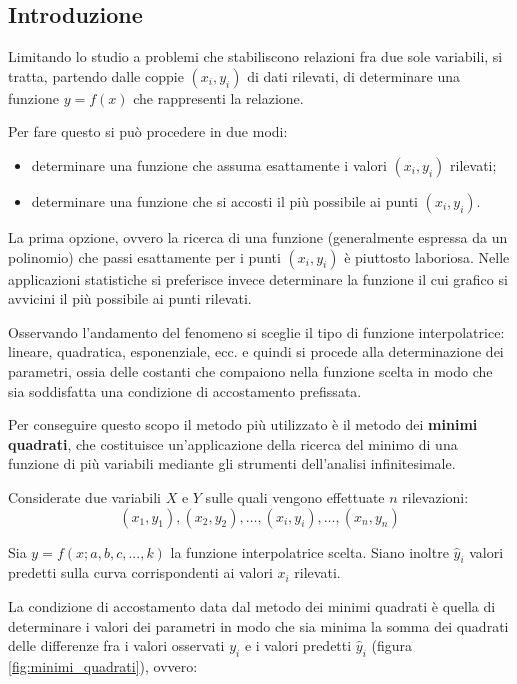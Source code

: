 \subsection{Introduzione}\label{ssec:regressione-introduzione}
Limitando lo studio a problemi che stabiliscono relazioni fra due sole variabili, si tratta, partendo dalle coppie $(x_i, y_i)$ di dati rilevati, di determinare una funzione $y=f(x)$ che rappresenti la relazione.

Per fare questo si può procedere in due modi:

\begin{itemize}
  \item determinare una funzione che assuma esattamente i valori $(x_i, y_i)$ rilevati;
  \item determinare una funzione che si accosti il più possibile ai punti $(x_i, y_i)$.
\end{itemize}

La prima opzione, ovvero la ricerca di una funzione (generalmente espressa da un polinomio) che passi esattamente per i punti $(x_i, y_i)$ è piuttosto laboriosa. Nelle applicazioni statistiche si preferisce invece determinare la funzione il cui grafico si avvicini il più possibile ai punti rilevati.

Osservando l’andamento del fenomeno si sceglie il tipo di funzione interpolatrice: lineare, quadratica, esponenziale, ecc. e quindi si procede alla determinazione dei parametri, ossia delle costanti che compaiono nella funzione scelta in modo che sia soddisfatta una condizione di accostamento prefissata.

Per conseguire questo scopo il metodo più utilizzato è il metodo dei \textbf{minimi quadrati}, che costituisce un’applicazione della ricerca del minimo di una funzione di più variabili mediante gli strumenti dell’analisi infinitesimale.

Considerate due variabili $X$ e $Y$ sulle quali vengono effettuate $n$ rilevazioni: $$\left(x_{1}, y_{1}\right),\left(x_{2}, y_{2}\right), \ldots,\left(x_{i}, y_{i}\right), \ldots,\left(x_{n}, y_{n}\right)$$

Sia $y=f(x; a, b, c, ..., k)$ la funzione interpolatrice scelta. Siano inoltre $\hat{y}_{i}$ valori predetti sulla curva corrispondenti ai valori $x_i$ rilevati.

La condizione di accostamento data dal metodo dei minimi quadrati è quella di determinare i valori dei parametri in modo che sia minima la somma dei quadrati delle differenze fra i valori osservati $y_i$ e i valori predetti $\hat{y}_i$ (figura \ref{fig:minimi_quadrati}), ovvero:

